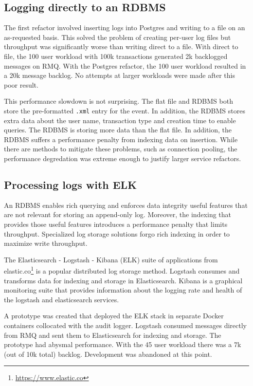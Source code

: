 \subsection{Logging directly to an RDBMS}\label{sec:log-rdbms}
The first refactor involved inserting logs into Postgres and writing to a file on an as-requested basis.
This solved the problem of creating per-user log files but throughput was significantly worse than writing direct to a file.
With direct to file, the 100 user workload with 100k transactions generated 2k backlogged messages on RMQ.
With the Postgres refactor, the 100 user workload resulted in a 20k message backlog.
No attempts at larger workloads were made after this poor result.

This performance slowdown is not surprising.
The flat file and RDBMS both store the pre-formatted \texttt{.xml} entry for the event.
In addition, the RDBMS stores extra data about the user name, transaction type and creation time to enable queries.
The RDBMS is storing more data than the flat file.
In addition, the RDBMS suffers a performance penalty from indexing data on insertion.
While there are methods to mitigate these problems, such as connection pooling, the performance degredation was extreme enough to justify larger service refactors.

\subsection{Processing logs with ELK}
An RDBMS enables rich querying and enforces data integrity \textemdash{} useful features that are not relevant for storing an append-only log.
Moreover, the indexing that provides those useful features introduces a performance penalty that limits throughput.
Specialized log storage solutions forgo rich indexing in order to maximize write throughput.

The Elasticsearch - Logstash - Kibana (ELK) suite of applications from elastic.co\footnote{\url{https://www.elastic.co}} is a popular distributed log storage method.
Logstash consumes and transforms data for indexing and storage in Elasticsearch.
Kibana is a graphical monitoring suite that provides information about the logging rate and health of the logstash and elasticsearch services.

A prototype was created that deployed the ELK stack in separate Docker containers collocated with the audit logger.
Logstash consumed messages directly from RMQ and sent them to Elasticsearch for indexing and storage.
The prototype had abysmal performance.
With the 45 user workload there was a 7k (out of 10k total) backlog.
Development was abandoned at this point.

